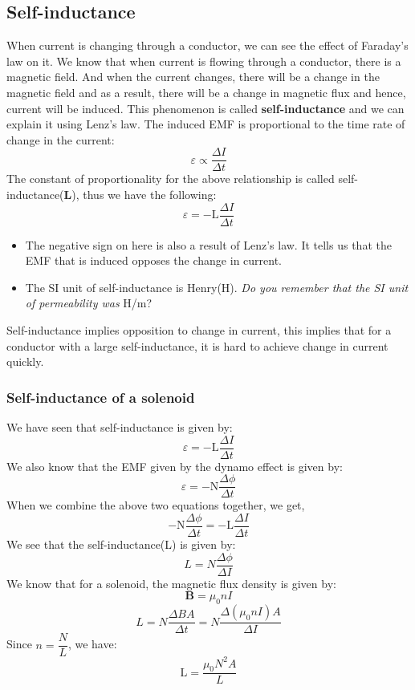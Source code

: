 \documentclass[9pt]{article}
\begin{document}
	\subsection*{Self-inductance}
	When current is changing through a conductor, we can see the effect of Faraday's law on it. We know that when current is flowing through a conductor, there is a magnetic field. And when the current changes, there will be a change in the magnetic field and as a result, there will be a change in magnetic flux and hence, current will be induced. This phenomenon is called \textbf{self-inductance} and we can explain it using Lenz's law. The induced EMF is proportional to the time rate of change in the current:
	$$\varepsilon\propto\dfrac{\Delta I}{\Delta t}$$
	The constant of proportionality for the above relationship is called self-inductance(\textbf{L}), thus we have the following:
	$$\varepsilon=-\text{L}\dfrac{\Delta I}{\Delta t}$$
	\begin{itemize}
		\item The negative sign on here is also a result of Lenz's law. It tells us that the EMF that is induced opposes the change in current.
		\item The SI unit of self-inductance is Henry(H). \textit{Do you remember that the SI unit of permeability was} H/m?
	\end{itemize}
	Self-inductance implies opposition to change in current, this implies that for a conductor with a large self-inductance, it is hard to achieve change in current quickly.
	\subsubsection*{Self-inductance of a solenoid}
	We have seen that self-inductance is given by:
	$$\varepsilon=-\text{L}\dfrac{\Delta I}{\Delta t}$$
	We also know that the EMF given by the dynamo effect is given by:
	$$\varepsilon=-\text{N}\dfrac{\Delta\phi}{\Delta t}$$
	When we combine the above two equations together, we get, 
	$$-\text{N}\dfrac{\Delta\phi}{\Delta t}=-\text{L}\dfrac{\Delta I}{\Delta t }$$
	We see that the self-inductance(L) is given by:
	$$L=N\dfrac{\Delta\phi}{\Delta I}$$
	We know that for a solenoid, the magnetic flux density is given by:
	$$\textbf{B}=\mu_0nI$$
	$$L=N\dfrac{\Delta BA}{\Delta t}=N\dfrac{\Delta (\mu_0nI)A}{\Delta I}$$
	Since $n=\dfrac{N}{L}$, we have:
	$$\text{L}=\dfrac{\mu_0N^2A}{L}$$
\end{document}
